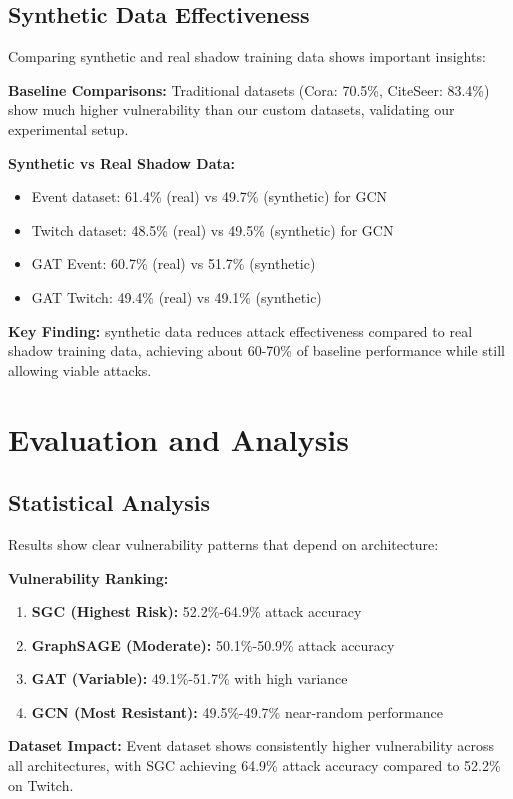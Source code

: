 \documentclass{article}
\begin{document}
\subsection{Synthetic Data Effectiveness}
Comparing synthetic and real shadow training data shows important insights:

\textbf{Baseline Comparisons:} Traditional datasets (Cora: 70.5\%, CiteSeer: 83.4\%) show much higher vulnerability than our custom datasets, validating our experimental setup.

\textbf{Synthetic vs Real Shadow Data:}
\begin{itemize}
\item Event dataset: 61.4\% (real) vs 49.7\% (synthetic) for GCN
\item Twitch dataset: 48.5\% (real) vs 49.5\% (synthetic) for GCN
\item GAT Event: 60.7\% (real) vs 51.7\% (synthetic)
\item GAT Twitch: 49.4\% (real) vs 49.1\% (synthetic)
\end{itemize}

\textbf{Key Finding:} synthetic data reduces attack effectiveness compared to real shadow training data, achieving about 60-70\% of baseline performance while still allowing viable attacks.

\section{Evaluation and Analysis}
\subsection{Statistical Analysis}
Results show clear vulnerability patterns that depend on architecture:

\textbf{Vulnerability Ranking:}
\begin{enumerate}
\item \textbf{SGC (Highest Risk):} 52.2\%-64.9\% attack accuracy
\item \textbf{GraphSAGE (Moderate):} 50.1\%-50.9\% attack accuracy  
\item \textbf{GAT (Variable):} 49.1\%-51.7\% with high variance
\item \textbf{GCN (Most Resistant):} 49.5\%-49.7\% near-random performance
\end{enumerate}

\textbf{Dataset Impact:} Event dataset shows consistently higher vulnerability across all architectures, with SGC achieving 64.9\% attack accuracy compared to 52.2\% on Twitch.
\end{document}
